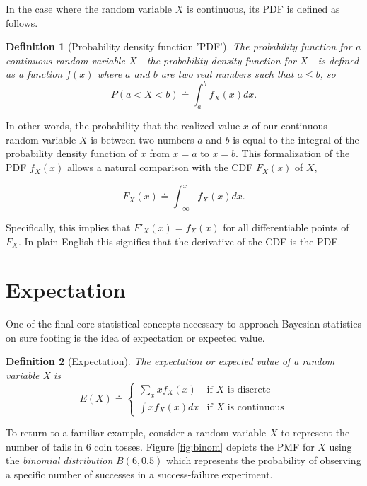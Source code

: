 \documentclass[
  12pt,
]{book}
\theoremstyle{definition}
\newtheorem{definition}{Definition}[chapter]
\theoremstyle{definition}
\theoremstyle{definition}
\theoremstyle{remark}
\begin{document}
In the case where the random variable \(X\) is continuous, its PDF is defined as follows.

\begin{definition}[Probability density function 'PDF']
\protect\hypertarget{def:pdf}{}{\label{def:pdf} {} }\emph{The probability function for a continuous random variable \(X\)---the probability density function for \(X\)---is defined as a function \(f(x)\) where \(a\) and \(b\) are two real numbers such that \(a ≤ b\), so}
\[P(a<X<b) \doteq \int_{a}^{b}f_X(x)dx.\]
\end{definition}

In other words, the probability that the realized value \(x\) of our continuous random variable \(X\) is between two numbers \(a\) and \(b\) is equal to the integral of the probability density function of \(x\) from \(x = a\) to \(x = b\).
This formalization of the PDF \(f_X(x)\) allows a natural comparison with the CDF \(F_X(x)\) of \(X\),

\[F_X(x) \doteq \int_{-\infty}^{x}f_X(x)dx.\]

Specifically, this implies that \(F'_X(x)=f_X(x)\) for all differentiable points of \(F_X\).
In plain English this signifies that the derivative of the CDF is the PDF.

\hypertarget{expectation}{%
\section{Expectation}\label{expectation}}

One of the final core statistical concepts necessary to approach Bayesian statistics on sure footing is the idea of expectation or expected value.

\begin{definition}[Expectation]
\protect\hypertarget{def:e}{}{\label{def:e} {} }\emph{The expectation or expected value of a random variable X is}
\[E(X) \doteq \begin{cases}\sum_{x}xf_{X}(x) & \textrm{if }X\textrm{ is discrete}\\\int{xf_{X}(x)dx} & \textrm{if }X\textrm{ is continuous}\end{cases}\]
\end{definition}

To return to a familiar example, consider a random variable \(X\) to represent the number of tails in 6 coin tosses. Figure \ref{fig:binom} depicts the PMF for \(X\) using the \emph{binomial distribution} \(B(6,0.5)\) which represents the probability of observing a specific number of successes in a success-failure experiment.
\end{document}
